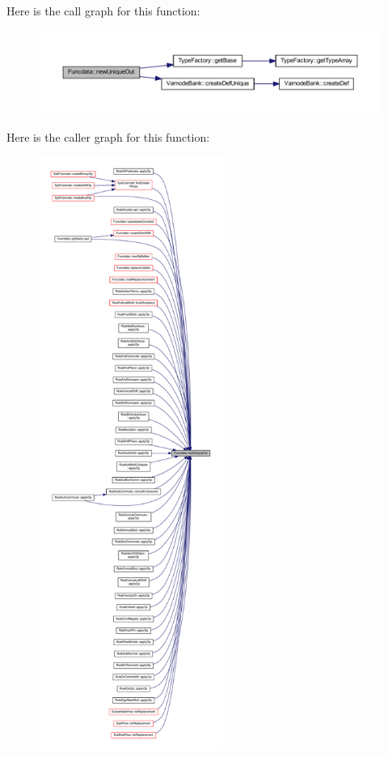 Here is the call graph for this function\+:
\nopagebreak
\begin{figure}[H]
\begin{center}
\leavevmode
\includegraphics[width=350pt]{class_funcdata_af189a9a5b390332c6e87c8faa334cd68_cgraph}
\end{center}
\end{figure}
Here is the caller graph for this function\+:
\nopagebreak
\begin{figure}[H]
\begin{center}
\leavevmode
\includegraphics[height=550pt]{class_funcdata_af189a9a5b390332c6e87c8faa334cd68_icgraph}
\end{center}
\end{figure}
\mbox{\label{class_funcdata_a22894e1c7b0f30a5391993924cd96d3d}} 
